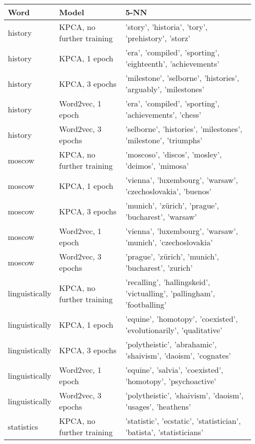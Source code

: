 \begin{table}[h!]
\begin{tabular}{|l|l|l|}
\hline
\rowcolor[HTML]{C0C0C0} 
\textbf{Word}  & \textbf{Model}          & \textbf{5-NN} \\ \hline
history &       KPCA, no further training & 'story', 'historia', 'tory', 'prehistory', 'storz'\\ \hline 
history        & KPCA, 1 epoch & 'era', 'compiled', 'sporting', 'eighteenth', 'achievements'\\ \hline
history        & KPCA, 3 epochs & 'milestone', 'selborne', 'histories', 'arguably', 'milestones'\\ \hline
history        & Word2vec, 1 epoch      &'era', 'compiled', 'sporting', 'achievements', 'chess' \\ \hline
history        & Word2vec, 3 epochs       &'selborne', 'histories', 'milestones', 'milestone', 'triumphs' \\ \hline
moscow         & KPCA, no further training & 'moscoso', 'discos', 'mosley', 'deimos', 'mimosa' \\ \hline
moscow         & KPCA, 1 epoch & 'vienna', 'luxembourg', 'warsaw', 'czechoslovakia', 'buenos'\\ \hline
moscow         & KPCA, 3 epochs & 'munich', 'zürich', 'prague', 'bucharest', 'warsaw' \\ \hline
moscow         & Word2vec, 1 epoch      & 'vienna', 'luxembourg', 'warsaw', 'munich', 'czechoslovakia'\\ \hline
moscow         & Word2vec, 3 epochs       & 'prague', 'zürich', 'munich', 'bucharest', 'zurich' \\ \hline
linguistically & KPCA, no further training & 'recalling', 'hallingskeid', 'victualling', 'pallingham', 'footballing'\\ \hline
linguistically & KPCA, 1 epoch & 'equine', 'homotopy', 'coexisted', 'evolutionarily', 'qualitative'\\ \hline
linguistically & KPCA, 3 epochs & 'polytheistic', 'abrahamic', 'shaivism', 'daoism', 'cognates'\\ \hline
linguistically & Word2vec, 1 epoch      &'equine', 'salvia', 'coexisted', 'homotopy', 'psychoactive' \\ \hline
linguistically & Word2vec, 3 epochs     & 'polytheistic', 'shaivism', 'daoism', 'usages', 'heathens'\\ \hline
statistics     & KPCA, no further training & 'statistic', 'ecstatic', 'statistician', 'batista', 'statisticians'\\ \hline

\end{tabular}
\end{table}
